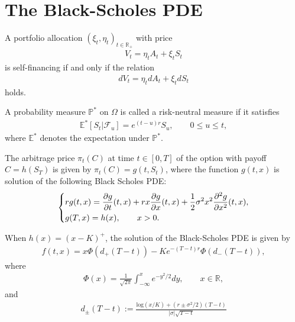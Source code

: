 \documentclass[12pt]{extarticle}
\newcommand{\<}{\langle}
\renewcommand{\>}{\rangle}
\theoremstyle{definition}
\begin{document}
\newpage
\section{The Black-Scholes PDE}
\begin{tcolorbox}[enhanced, drop fuzzy shadow, title=Proposition 6.1]
A portfolio allocation $(\xi_t, \eta_t)_{t\in \mathbb{R}_+}$ with price
\begin{align*}
    V_t = \eta_t A_t + \xi_t S_t
\end{align*}
is self-financing if and only if the relation
\begin{align*}
    dV_t = \eta_t dA_t + \xi_t dS_t
\end{align*}
holds.
\end{tcolorbox}

\begin{tcolorbox}[enhanced, drop fuzzy shadow, title=Definition 6.4]
A probability measure $\mathbb{P}^*$ on $\Omega$ is called a risk-neutral measure if it satisfies
\begin{align*}
    \mathbb{E}^*[S_t|\mathcal{F}_u] = e^{(t-u)r}S_u, \qquad 0\leq u \leq t,
\end{align*}
where $\mathbb{E}^*$ denotes the expectation under $\mathbb{P}^*$.
\end{tcolorbox}

\begin{tcolorbox}[enhanced, drop fuzzy shadow, title=Proposition 6.13]
The arbitrage price $\pi_t (C)$ at time $t \in [0,T]$ of the option with payoff $C=h(S_T)$ is given by $\pi_t (C) = g(t,S_t)$, where the function $g(t,x)$ is solution of the following Black Scholes PDE:
\begin{align*}
    \begin{dcases}
    rg(t,x) = \frac{\partial g}{\partial t}(t,x) + rx\frac{\partial g}{\partial x}(t,x) + \frac{1}{2}\sigma^2 x^2 \frac{\partial^2 g}{\partial x^2}(t,x),\\
    g(T,x)=h(x), \qquad x>0.
    \end{dcases}
\end{align*}
\end{tcolorbox}

\begin{tcolorbox}[enhanced, drop fuzzy shadow, title=Proposition 6.17]
When $h(x)=(x-K)^+$, the solution of the Black-Scholes PDE is given by
\begin{align*}
    f(t,x)=x\Phi(d_+ (T-t))-Ke^{-(T-t)r}\Phi(d_- (T-t)),
\end{align*}
where
\begin{align*}
    \Phi(x)=\frac{1}{\sqrt{2\pi}} \int^x_{-\infty}e^{-y^2/2}dy, \qquad x\in \mathbb{R},
\end{align*}
and
\begin{align*}
    d_\pm (T-t) := \frac{\text{log}(x/K) + (r\pm \sigma^2/2)(T-t)}{|\sigma|\sqrt{T-t}}
\end{align*}
\end{tcolorbox}
\end{document}
